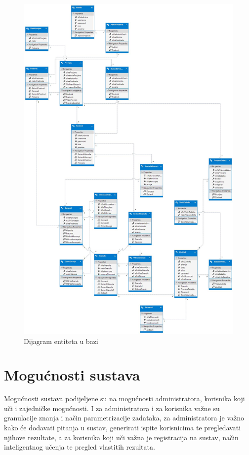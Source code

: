 \documentclass[times, utf8, zavrsni, numeric]{fer}
\begin{document}
\begin{figure}[htb]
	\centering
	\includegraphics[width=\textwidth,height=\textheight,keepaspectratio]{img/dijagramEntiteta.jpg}
	\caption{Dijagram entiteta u bazi}
	\label{fig:dijagramentiteta}
\end{figure}

\section{Mogućnosti sustava}
Mogućnosti sustava podijeljene su na mogućnosti administratora, korisnika koji uči i zajedničke mogućnosti. I za administratora i za korisnika važne su granulacije znanja i način parametrizacije zadataka, za administratora je važno kako će dodavati pitanja u sustav, generirati ispite korisnicima te pregledavati njihove rezultate, a za korisnika koji uči važna je registracija na sustav, način inteligentnog učenja te pregled vlastitih rezultata.
\end{document}
